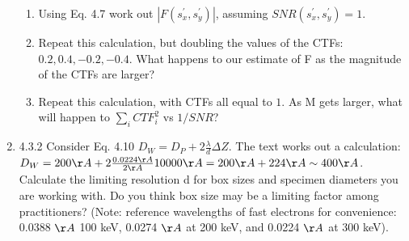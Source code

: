 \documentclass[11pt, oneside]{article}   	%
\begin{document}
\begin{enumerate}
\begin{enumerate}
			\item Using Eq. 4.7 work out $|F(s_x^\prime,s_y^\prime)|$, assuming $SNR(s_x^\prime,s_y^\prime)=1$.
			\item Repeat this calculation, but doubling the values of the CTFs: $0.2, 0.4, -0.2, -0.4$. What happens to our estimate of F as the magnitude of the CTFs are larger?
			\item Repeat this calculation, with CTFs all equal to $1$. As M gets larger, what will happen to $\sum_i CTF_i^2$ vs $1/SNR$?
		\end{enumerate}
	\item 4.3.2 Consider Eq. 4.10 $D_W =D_P +2\frac{\lambda}{d}\Delta Z.$ The text works out a calculation: $D_W = 200 \AA + 2 \frac{0.0224 \AA}{2 \AA}10000 \AA = 200 \AA + 224 \AA \sim 400 \AA$. Calculate the limiting resolution d for box sizes and specimen diameters you are working with. Do you think box size may be a limiting factor among practitioners? (Note: reference wavelengths of fast electrons for convenience: 0.0388 $\AA$ 100 keV, 0.0274 $\AA$ at 200 keV, and 0.0224 $\AA$ at 300 keV).
\end{enumerate}
\end{document}
